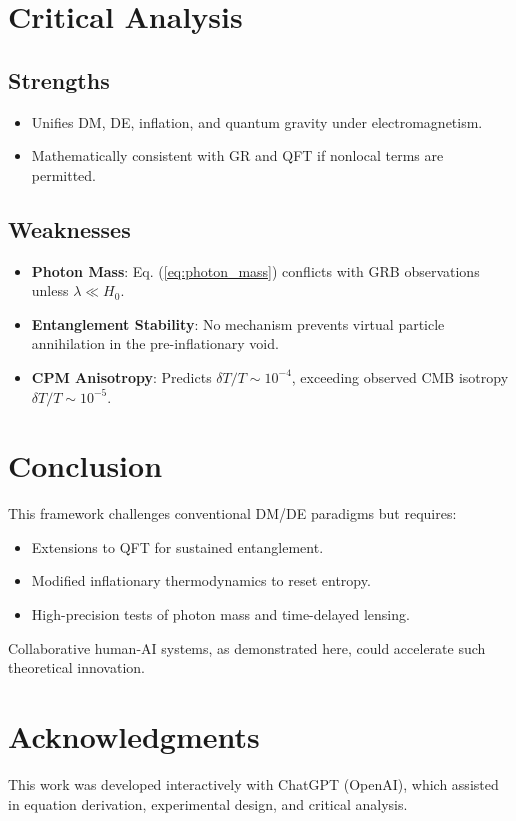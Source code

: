 \documentclass[12pt, a4paper]{article}
\begin{document}
\section{Critical Analysis}
\subsection{Strengths}
\begin{itemize}
\item Unifies DM, DE, inflation, and quantum gravity under electromagnetism.
\item Mathematically consistent with GR and QFT if nonlocal terms are permitted.
\end{itemize}

\subsection{Weaknesses}
\begin{itemize}
\item \textbf{Photon Mass}: Eq. (\ref{eq:photon_mass}) conflicts with GRB observations unless \( \lambda \ll H_0 \).
\item \textbf{Entanglement Stability}: No mechanism prevents virtual particle annihilation in the pre-inflationary void.
\item \textbf{CPM Anisotropy}: Predicts \( \delta T/T \sim 10^{-4} \), exceeding observed CMB isotropy \( \delta T/T \sim 10^{-5} \).
\end{itemize}

\section{Conclusion}
This framework challenges conventional DM/DE paradigms but requires:
\begin{itemize}
\item Extensions to QFT for sustained entanglement.
\item Modified inflationary thermodynamics to reset entropy.
\item High-precision tests of photon mass and time-delayed lensing.
\end{itemize}
Collaborative human-AI systems, as demonstrated here, could accelerate such theoretical innovation.

\section*{Acknowledgments}
This work was developed interactively with ChatGPT (OpenAI), which assisted in equation derivation, experimental design, and critical analysis.
\end{document}
